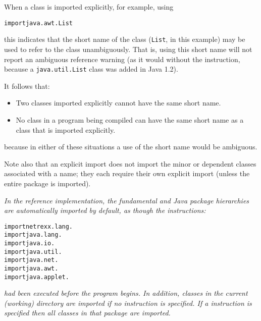 When a class is imported explicitly, for example, using
\begin{alltt}
import java.awt.List
\end{alltt}
this indicates that the short name of the class (\texttt{List},
in this example) may be used to refer to the class unambiguously.
That is, using this short name will not report an ambiguous reference
warning (as it would without the  instruction, because
a \texttt{java.util.List} class was added in Java 1.2).
 
It follows that:
\begin{itemize}
\item Two classes imported explicitly cannot have the same short name.
\item No class in a program being compiled can have the same short name as
a class that is imported explicitly.
\end{itemize}
because in either of these situations a use of the short name would
be ambiguous.
 
Note also that an explicit import does not import the minor or dependent
classes associated with a name; they each require their own explicit
import (unless the entire package is imported).
 
\emph{In the reference implementation, the fundamental \nr{} and Java
package hierarchies are automatically imported by default, as though the
instructions:}
\begin{alltt}
import netrexx.lang.
import java.lang.
import java.io.
import java.util.
import java.net.
import java.awt.
import java.applet.
\end{alltt}
\emph{had been executed before the program begins.
In addition, classes in the current (working) directory are imported if
no  instruction is specified.  If a 
instruction is specified then all classes in that package are imported.
}
